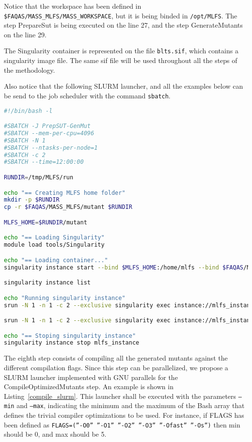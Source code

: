 Notice that the workspace has been defined in \texttt{\$FAQAS/MASS\_MLFS/MASS\_WORKSPACE}, but it is being binded in \texttt{/opt/MLFS}.
The step PrepareSut is being executed on the line 27, and the step GenerateMutants on the line 29.

The Singularity container is represented on the file \texttt{blts.sif}, which contains a singularity image file. The same sif file will be used throughout all the steps of the methodology.

Also notice that the following SLURM launcher, and all the examples below can be send to the job scheduler with the command \texttt{sbatch}.

\begin{lstlisting}[language=bash, label=prepare_slurm ,caption=Example of the SLURM launcher for PrepareSUT and GenerateMutants steps.]
#!/bin/bash -l

#SBATCH -J PrepSUT-GenMut
#SBATCH --mem-per-cpu=4096
#SBATCH -N 1
#SBATCH --ntasks-per-node=1
#SBATCH -c 2
#SBATCH --time=12:00:00

RUNDIR=/tmp/MLFS/run

echo "== Creating MLFS home folder"
mkdir -p $RUNDIR
cp -r $FAQAS/MASS_MLFS/mutant $RUNDIR

MLFS_HOME=$RUNDIR/mutant

echo "== Loading Singularity"
module load tools/Singularity

echo "== Loading container..."
singularity instance start --bind $MLFS_HOME:/home/mlfs --bind $FAQAS/MASS_MLFS/unit-test-suite:/home/mlfs/unit-test-suite --bind $FAQAS/MASS_MLFS/unit-reports:/home/mlfs/unit-reports --bind $FAQAS/MASS_MLFS/MASS_WORKSPACE:/opt/MLFS --bind $FAQAS/srcirorfaqas:/opt/srcirorfaqas $FAQAS/MASS_MLFS/blts.sif mlfs_instance

singularity instance list

echo "Running singularity instance"
srun -N 1 -n 1 -c 2 --exclusive singularity exec instance://mlfs_instance /bin/bash /opt/MLFS/PrepareSUT.sh

srun -N 1 -n 1 -c 2 --exclusive singularity exec instance://mlfs_instance /bin/bash /opt/MLFS/GenerateMutants.sh

echo "== Stoping singularity instance"
singularity instance stop mlfs_instance
\end{lstlisting}

The eighth step consists of compiling all the generated mutants against the different compilation flags. Since this step can be parallelized, we propose a SLURM launcher implemented with GNU parallels for the CompileOptimizedMutants step. An example is shown in Listing~\ref{compile_slurm}. This launcher shall be executed with the parameters \texttt{--min} and \texttt{--max}, indicating the minimum and the maximum of the Bash array that defines the trivial compiler optimizations to be used. For instance, if FLAGS has been defined as \texttt{FLAGS=(”-O0” ”-O1” ”-O2” ”-O3” ”-Ofast” ”-Os”)} then min should be 0, and max should be 5.

